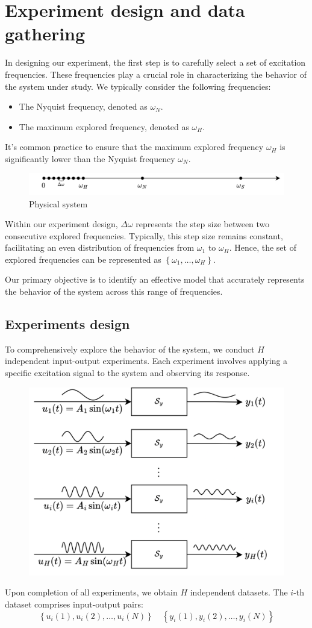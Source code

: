 \section{Experiment design and data gathering}

In designing our experiment, the first step is to carefully select a set of excitation frequencies. 
These frequencies play a crucial role in characterizing the behavior of the system under study. 
We typically consider the following frequencies:
\begin{itemize}
    \item The Nyquist frequency, denoted as $\omega_N$.
    \item The maximum explored frequency, denoted as $\omega_H$.
\end{itemize}
It's common practice to ensure that the maximum explored frequency $\omega_H$ is significantly lower than the Nyquist frequency $\omega_N$.
\begin{figure}[H]
    \centering
    \includegraphics[width=1\linewidth]{images/experiment.png}
    \caption{Physical system}
\end{figure}
Within our experiment design, $\Delta\omega$ represents the step size between two consecutive explored frequencies. 
Typically, this step size remains constant, facilitating an even distribution of frequencies from $\omega_1$ to $\omega_H$. 
Hence, the set of explored frequencies can be represented as $\left\{\omega_1,\dots,\omega_H\right\}$. 

Our primary objective is to identify an effective model that accurately represents the behavior of the system across this range of frequencies.

\subsection{Experiments design}
To comprehensively explore the behavior of the system, we conduct $H$ independent input-output experiments. 
Each experiment involves applying a specific excitation signal to the system and observing its response. 
\begin{figure}[H]
    \centering
    \includegraphics[width=0.6\linewidth]{images/exp.png}
\end{figure}
Upon completion of all experiments, we obtain $H$ independent datasets. 
The $i$-th dataset comprises input-output pairs:
\[\left\{u_i(1),u_i(2),\dots, u_i(N)\right\} \quad \left\{y_i(1),y_i(2),\dots, y_i(N)\right\}\]

